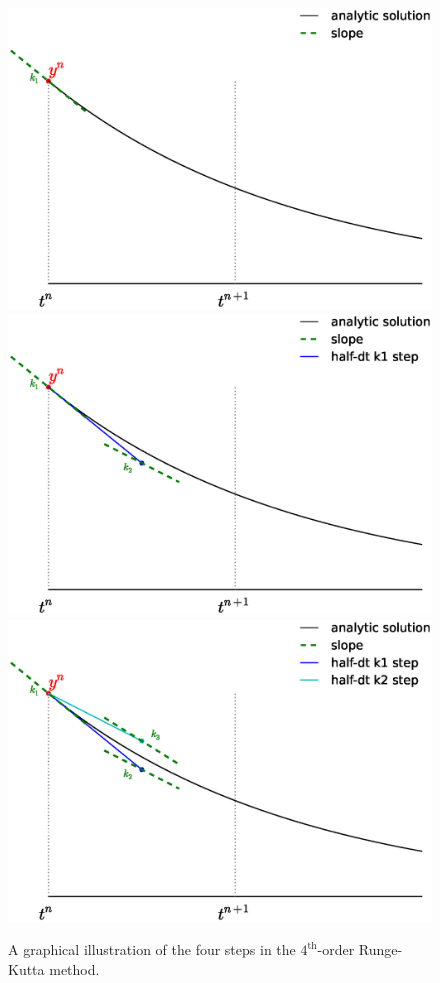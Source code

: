 \begin{figure}[t]
\centering
\includegraphics[width=0.65\linewidth]{rk4_k1.eps} \\
\includegraphics[width=0.65\linewidth]{rk4_k2.eps} \\
\includegraphics[width=0.65\linewidth]{rk4_k3.eps} \\
%
\caption[The $4^\mathrm{th}$-order Runge-Kutta method] {\label{fig:rk}
  A graphical illustration of the four steps in the
  $4^\mathrm{th}$-order Runge-Kutta method.}
\end{figure}

